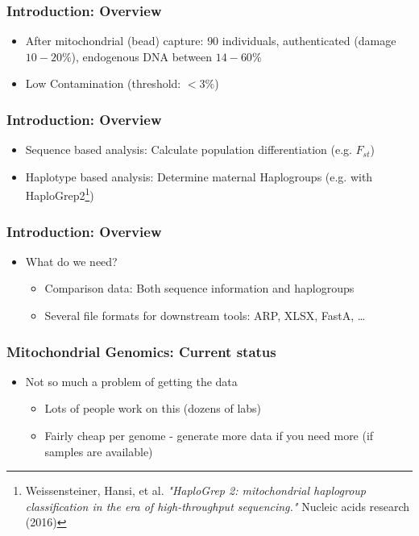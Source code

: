 \documentclass{beamer} %
\begin{document}
\begin{frame}
\frametitle{Introduction: Overview}
\begin{itemize}
\item After mitochondrial (bead) capture: $90$ individuals, authenticated (damage $10-20\%$), endogenous DNA between $14-60\%$
\item Low Contamination (threshold: $<3\%$) 
\end{itemize}
\end{frame}

\begin{frame}
\frametitle{Introduction: Overview}
\begin{itemize}
\item Sequence based analysis: Calculate population differentiation (e.g. $F_{st}$)
\item Haplotype based analysis: Determine maternal Haplogroups (e.g. with HaploGrep2\footnote{Weissensteiner, Hansi, et al. \textit{"HaploGrep 2: mitochondrial haplogroup classification in the era of high-throughput sequencing."} Nucleic acids research (2016)})
\end{itemize}
\end{frame}

\begin{frame}
\frametitle{Introduction: Overview}
\begin{itemize}
\item What do we need? \pause
\begin{itemize}
\item Comparison data: Both sequence information and haplogroups \pause
\item Several file formats for downstream tools: ARP, XLSX, FastA, \ldots
\end{itemize}
\end{itemize}
\end{frame}

\begin{frame}
\frametitle{Mitochondrial Genomics: Current status}
\begin{itemize}
\item Not so much a problem of getting the data
\pause
\begin{itemize}
\item Lots of people work on this (dozens of labs)\pause
\item Fairly cheap per genome - generate more data if you need more (if samples are available) 
\end{itemize}
\end{itemize}
\end{frame}
\end{document}
